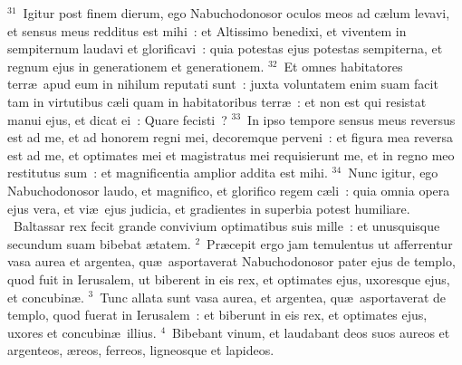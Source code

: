 ${}^{31}$~Igitur post finem dierum, ego Nabuchodonosor oculos meos ad c\ae lum levavi, et sensus meus redditus est mihi~: et Altissimo benedixi, et viventem in sempiternum laudavi et glorificavi~: quia potestas ejus potestas sempiterna, et regnum ejus in generationem et generationem.
${}^{32}$~Et omnes habitatores terr\ae\ apud eum in nihilum reputati sunt~: juxta voluntatem enim suam facit tam in virtutibus c\ae li quam in habitatoribus terr\ae~: et non est qui resistat manui ejus, et dicat ei~: Quare fecisti~?
${}^{33}$~In ipso tempore sensus meus reversus est ad me, et ad honorem regni mei, decoremque perveni~: et figura mea reversa est ad me, et optimates mei et magistratus mei requisierunt me, et in regno meo restitutus sum~: et magnificentia amplior addita est mihi.
${}^{34}$~Nunc igitur, ego Nabuchodonosor laudo, et magnifico, et glorifico regem c\ae li~: quia omnia opera ejus vera, et vi\ae\ ejus judicia, et gradientes in superbia potest humiliare.
~\lettrine[lines=10,image=true,loversize=0.05,lraise=-0.03]{B}{}altassar rex fecit grande convivium optimatibus suis mille~: et unusquisque secundum suam bibebat \ae tatem.
${}^{2}$~Pr\ae cepit ergo jam temulentus ut afferrentur vasa aurea et argentea, qu\ae\ asportaverat Nabuchodonosor pater ejus de templo, quod fuit in Ierusalem, ut biberent in eis rex, et optimates ejus, uxoresque ejus, et concubin\ae .
${}^{3}$~Tunc allata sunt vasa aurea, et argentea, qu\ae\ asportaverat de templo, quod fuerat in Ierusalem~: et biberunt in eis rex, et optimates ejus, uxores et concubin\ae\ illius.
${}^{4}$~Bibebant vinum, et laudabant deos suos aureos et argenteos, \ae reos, ferreos, ligneosque et lapideos.


